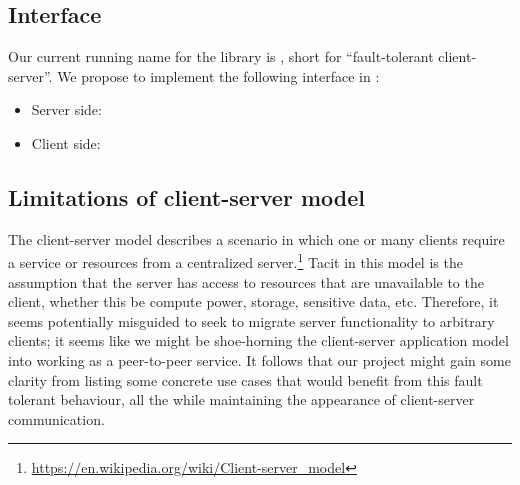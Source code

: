 \subsection{Interface}

Our current running name for the library is \APIname, short for ``fault-tolerant client-server''. We propose to implement the following interface in \APIname:

\begin{itemize}
	\item Server side:
    \begin{itemize}
    \end{itemize}
    \item Client side:
    	\begin{itemize}
    	\end{itemize}
\end{itemize}

\subsection{Limitations of client-server model}

The client-server model describes a scenario in which one or many clients require a service or resources from a centralized server.\footnote{\url{https://en.wikipedia.org/wiki/Client-server_model}} Tacit in this model is the assumption that the server has access to resources that are unavailable to the client, whether this be compute power, storage, sensitive data, etc. Therefore, it seems potentially misguided to seek to migrate server functionality to arbitrary clients; it seems like we might be shoe-horning the client-server application model into working as a peer-to-peer service. It follows that our project might gain some clarity from listing some concrete use cases that would benefit from this fault tolerant behaviour, all the while maintaining the appearance of client-server communication. 

